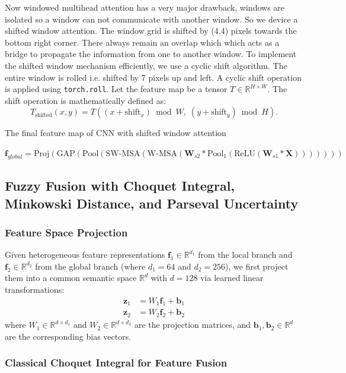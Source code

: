 \documentclass[preprint,12pt]{elsarticle}
\begin{document}
Now windowed multihead attention has a very major drawback, windows are isolated so a window can not communicate with another window. So we device a shifted window attention. The window grid is shifted by (4,4) pixels towards the bottom right corner. There always remain an overlap which which acts as a bridge to propagate the information from one to another window. To implement the shifted window mechanism efficiently, we use a cyclic shift algorithm. The entire window is rolled i.e. shifted by 7 pixels up and left. 
A cyclic shift operation is applied using \texttt{torch.roll}.  
Let the feature map be a tensor $T \in \mathbb{R}^{H \times W}$.  
The shift operation is mathematically defined as:
\[
T_{\text{shifted}}(x, y)
=
T\!\left( (x + \text{shift}_x) \bmod W,\; (y + \text{shift}_y) \bmod H \right).
\]

The final feature map of CNN with shifted window attention

$\mathbf{f}_{global} = \mathrm{Proj}(\mathrm{GAP}(\mathrm{Pool}(\mathrm{SW\text{-}MSA}(\mathrm{W\text{-}MSA}(\mathbf{W}_{s2} * \mathrm{Pool}_1(\mathrm{ReLU}(\mathbf{W}_{s1} * \mathbf{X})))))))$


\FloatBarrier
\subsection{Fuzzy Fusion with Choquet Integral, Minkowski Distance, and Parseval Uncertainty}

\subsubsection{Feature Space Projection}

Given heterogeneous feature representations $\mathbf{f}_1 \in \mathbb{R}^{d_1}$ from the local branch and $\mathbf{f}_2 \in \mathbb{R}^{d_2}$ from the global branch (where $d_1 = 64$ and $d_2 = 256$), we first project them into a common semantic space $\mathbb{R}^d$ with $d = 128$ via learned linear transformations:
\begin{align*}
    \mathbf{z}_1 &= W_1 \mathbf{f}_1 + \mathbf{b}_1 \\
    \mathbf{z}_2 &= W_2 \mathbf{f}_2 + \mathbf{b}_2
\end{align*}
where $W_1 \in \mathbb{R}^{d \times d_1}$ and $W_2 \in \mathbb{R}^{d \times d_2}$ are the projection matrices, and $\mathbf{b}_1, \mathbf{b}_2 \in \mathbb{R}^d$ are the corresponding bias vectors.

\subsubsection{Classical Choquet Integral for Feature Fusion}
\end{document}
